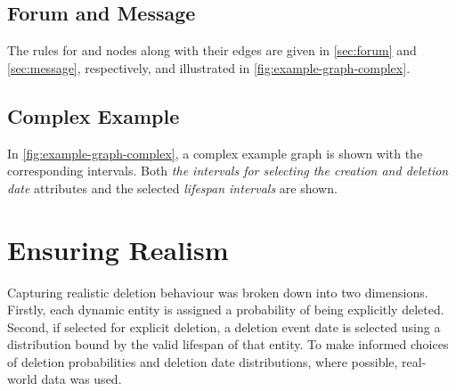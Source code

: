 \subsection{Forum and Message}

The rules for \tForum and \tMessage nodes along with their edges are given in \autoref{sec:forum} and \autoref{sec:message}, respectively, and illustrated in \autoref{fig:example-graph-complex}.




\subsection{Complex Example}
\label{sec:complex-example}

In \autoref{fig:example-graph-complex}, a complex example graph is shown with the corresponding intervals.
Both \emph{the intervals for selecting the creation and deletion date} attributes and the selected \emph{lifespan intervals} are shown.




\section{Ensuring Realism}
\label{sec:ensuring-realism}

Capturing realistic deletion behaviour was broken down into two dimensions.
Firstly, each dynamic entity is assigned a probability of being explicitly deleted.
Second, if selected for explicit deletion, a deletion event date is selected using a distribution bound by the valid lifespan of that entity.
To make informed choices of deletion probabilities and deletion date distributions, where possible, real-world data was used.

